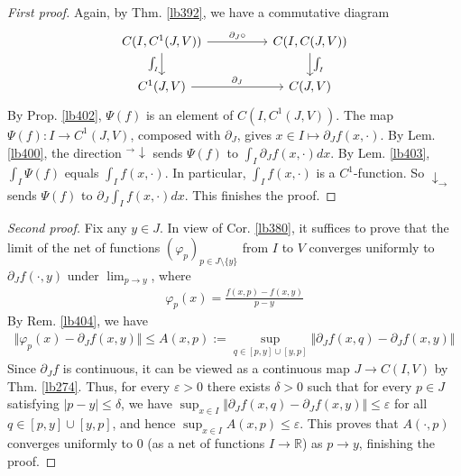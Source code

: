 \documentclass[12pt,b5paper,notitlepage]{article}
\theoremstyle{definition}
\theoremstyle{plain}
\newcommand{\Rbb}{\mathbb R}
\newcommand{\eps}{\varepsilon}
\numberwithin{equation}{section}
\begin{document}
\begin{proof}[First proof]
Again, by Thm. \ref{lb392}, we have a commutative diagram
\begin{equation*}
\begin{tikzcd}[column sep=huge]
C(I,C^1(J,V)) \arrow[r,"\partial_J\circ"] \arrow[d,"\int_I"'] & C(I,C(J,V)) \arrow[d,"\int_I"] \\
C^1(J,V) \arrow[r,"\partial_J"]           & C(J,V)         
\end{tikzcd} 
\end{equation*}
By Prop. \ref{lb402}, $\Psi(f)$ is an element of $C(I,C^1(J,V))$. The map $\Psi(f):I\rightarrow C^1(J,V)$, composed with $\partial_J$, gives $x\in I\mapsto\partial_Jf(x,\cdot)$. 
By Lem. \ref{lb400}, the direction ${}^\rightarrow\!\downarrow$ sends $\Psi(f)$ to $\int_I\partial_J f(x,\cdot)dx$. By Lem. \ref{lb403}, $\int_I\Psi(f)$ equals $\int_I f(x,\cdot)$. In particular, $\int_I f(x,\cdot)$ is a $C^1$-function. So $\downarrow_\rightarrow$ sends $\Psi(f)$ to $\partial_J\int_I f(x,\cdot)dx$. This finishes the proof.
\end{proof}



\begin{proof}[Second proof]
Fix any $y\in J$. In view of Cor. \ref{lb380}, it suffices to prove that the limit of the net of functions $(\varphi_p)_{p\in J\setminus\{y\}}$ from $I$ to $V$ converges uniformly to $\partial_Jf(\cdot,y)$ under $\lim_{p\rightarrow y}$, where
\begin{align*}
\varphi_p(x)=\frac{f(x,p)-f(x,y)}{p-y}
\end{align*}
By Rem. \ref{lb404}, we have
\begin{align*}
\Vert \varphi_p(x)-\partial_Jf(x,y)\Vert\leq A(x,p):=\sup_{q\in[p,y]\cup[y,p]}\Vert \partial_Jf(x,q)-\partial_Jf(x,y)\Vert
\end{align*}
Since $\partial_Jf$ is continuous, it can be viewed as a continuous map $J\rightarrow C(I,V)$ by Thm. \ref{lb274}. Thus, for every $\eps>0$ there exists $\delta>0$ such that for every $p\in J$ satisfying $|p-y|\leq\delta$, we have $\sup_{x\in I}\Vert \partial_Jf(x,q)-\partial_Jf(x,y)\Vert\leq\eps$ for all $q\in[p,y]\cup[y,p]$, and hence $\sup_{x\in I}A(x,p)\leq\eps$. This proves that $A(\cdot,p)$ converges uniformly to $0$ (as a net of functions $I\rightarrow\Rbb$) as $p\rightarrow y$, finishing the proof.
\end{proof}
\end{document}

